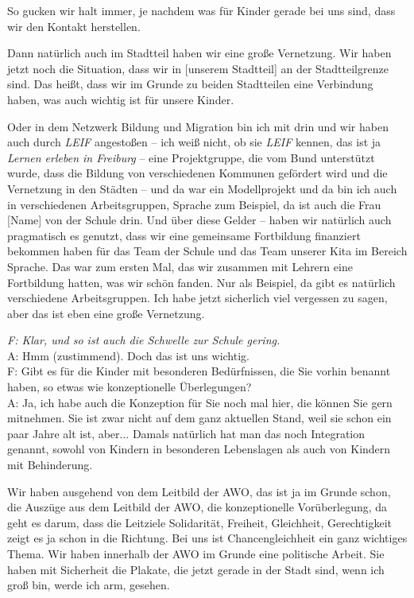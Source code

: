 \begin{linenumbers*}
So gucken wir halt immer, je nachdem was für Kinder gerade bei uns sind, dass wir den Kontakt herstellen. 

Dann natürlich auch im Stadtteil haben wir eine große Vernetzung. Wir haben jetzt noch die Situation, dass wir in [unserem Stadtteil] an der Stadtteilgrenze sind. Das heißt, dass wir im Grunde zu beiden Stadtteilen eine Verbindung haben, was auch wichtig ist für unsere Kinder.

Oder in dem Netzwerk Bildung und Migration bin ich mit drin und wir haben auch durch \emph{LEIF} angestoßen -- ich weiß nicht, ob sie \emph{LEIF} kennen, das ist ja \emph{Lernen erleben in Freiburg} -- eine Projektgruppe, die vom Bund unterstützt wurde, dass die Bildung von verschiedenen Kommunen gefördert wird und die Vernetzung in den Städten  -- und da war ein Modellprojekt und da bin ich auch in verschiedenen Arbeitsgruppen, Sprache zum Beispiel, da ist auch die Frau [Name] von der Schule drin.
Und über diese Gelder -- haben wir natürlich auch pragmatisch es genutzt, dass wir eine gemeinsame Fortbildung finanziert bekommen haben für das Team der Schule und das Team unserer Kita im Bereich Sprache. Das war zum ersten Mal, das wir zusammen mit Lehrern eine Fortbildung hatten, was wir schön fanden. Nur als Beispiel, da gibt es natürlich verschiedene Arbeitsgruppen. Ich habe jetzt sicherlich viel vergessen zu sagen, aber das ist eben eine große Vernetzung. 

\emph{F: Klar, und so ist auch die Schwelle zur Schule gering.}\\
A: Hmm (zustimmend). Doch das ist uns wichtig.\\

{F: Gibt es für die Kinder mit besonderen Bedürfnissen, die Sie vorhin benannt haben, so etwas wie konzeptionelle Überlegungen?}\\
A: Ja, ich habe auch die Konzeption für Sie noch mal hier, die können Sie gern mitnehmen. Sie ist zwar nicht auf dem ganz aktuellen Stand, weil sie schon ein paar Jahre alt ist, aber... Damals natürlich hat man das noch Integration genannt, sowohl von Kindern in besonderen Lebenslagen als auch von Kindern mit Behinderung. 

Wir haben ausgehend von dem Leitbild der AWO, das ist ja im Grunde schon, die Auszüge aus dem Leitbild der AWO, die konzeptionelle Vorüberlegung, da geht es darum, dass die Leitziele Solidarität, Freiheit, Gleichheit, Gerechtigkeit zeigt es ja schon in die Richtung.
Bei uns ist Chancengleichheit ein ganz wichtiges Thema. 
Wir haben innerhalb der AWO im Grunde eine politische Arbeit. Sie haben mit Sicherheit die Plakate, die jetzt gerade in der Stadt sind, wenn ich groß bin, werde ich arm, gesehen. 


\end{linenumbers*}
